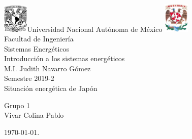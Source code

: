 

     \begin{center}
	\includegraphics[width=0.09\textwidth]{UNAM}\Large Universidad Nacional Autónoma de México
        	\includegraphics[width=0.09\textwidth]{FI}\\[1.5cm]
        \Large Facultad de Ingeniería\\[1.5cm]
        
        
        \Large  Sistemas Energéticos\\[1.5cm]
       
         \Large Introducción a los sistemas energéticos\\[1.5cm]
        
         \Large 
         M.I. Judith Navarro Gómez\\[1.5cm]
        \Large Semestre 2019-2\\[1.5cm]
        
       
    
        \Large Situación energética de Japón\\[1.5cm]
        
           

        
          \begin{flushright}
\footnotesize  Grupo 1\\[1cm]
\footnotesize Vivar Colina Pablo\\[0.5cm]
 \end{flushright}
          \begin{flushleft}
         \footnotesize \today.\\
          \end{flushleft}
         
          
   \end{center}
